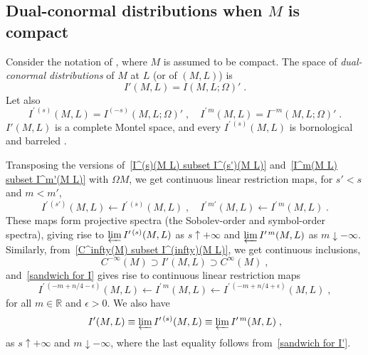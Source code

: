 \documentclass{memo-l}
\theoremstyle{plain}
\theoremstyle{definition}
\theoremstyle{remark}
\newcommand{\R}{\mathbb{R}}
\numberwithin{section}{chapter}
\numberwithin{equation}{section}%
\begin{document}
\subsection{Dual-conormal distributions when $M$ is compact}\label{ss: dual-conormal distribs - compact} 

Consider the notation of , where $M$ is assumed to be compact. The space of \emph{dual-conormal distributions}  of $M$ at $L$ (or of $(M,L)$) is \cite[Chapter~6]{Melrose1996} 
\begin{equation}\label{I'(M L) = I(M L Omega)'}
I'(M,L)=I(M,L;\Omega)'\;.
\end{equation}
Let also
\begin{equation}\label{I^prime (s)(M L) = I^(-s)(M L Omega)'}
I^{\prime\,(s)}(M,L)=I^{(-s)}(M,L;\Omega)'\;,\quad I^{\prime\,m}(M,L)=I^{-m}(M,L;\Omega)'\;.
\end{equation}
$I'(M,L)$ is a complete Montel space, and every $I^{\prime\,(s)}(M,L)$ is bornological and barreled \cite[Corollaries~5.1 and~5.2]{AlvKordyLeichtnam-conormal}. 

Transposing the versions of~\eqref{I^(s)(M L) subset I^(s')(M L)} and~\eqref{I^m(M L) subset I^m'(M L)} with $\Omega M$, we get continuous linear restriction maps, for $s'<s$ and $m<m'$,
\begin{equation}\label{I^prime m(M L) to I^prime m'(M L)}
I^{\prime\,(s')}(M,L)\leftarrow I^{\prime\,(s)}(M,L)\;,\quad I^{\prime\,m'}(M,L)\leftarrow I^{\prime\,m}(M,L)\;.
\end{equation}
These maps form projective spectra (the Sobolev-order and symbol-order spectra), giving rise to $\varprojlim I^{\prime\,(s)}(M,L)$ as $s\uparrow+\infty$ and $\varprojlim I^{\prime\,m}(M,L)$ as $m\downarrow-\infty$. Similarly, from~\eqref{C^infty(M) subset I^(infty)(M L)}, we get continuous inclusions,
\begin{equation}\label{C^-infty(M) supset I'(M L) supset C^infty(M)}
C^{-\infty}(M)\supset I'(M,L)\supset C^\infty(M)\;,
\end{equation}
and~\eqref{sandwich for I} gives rise to continuous linear restriction maps
\begin{equation}\label{sandwich for I'}
I^{\prime\,(-m+n/4-\epsilon)}(M,L)\leftarrow I^{\prime\,m}(M,L)\leftarrow I^{\prime\,(-m+n/4+\epsilon)}(M,L)\;,
\end{equation}
for all $m\in\R$ and $\epsilon>0$. We also have \cite[Corollary 5.3]{AlvKordyLeichtnam-conormal}
\begin{equation}\label{I'(M L) equiv projlim I^prime (s)(M L) equiv projlim I^prime m(M L)}
I'(M,L)\equiv\varprojlim I^{\prime\,(s)}(M,L)\equiv\varprojlim I^{\prime\,m}(M,L)\;,
\end{equation}
as $s\uparrow+\infty$ and $m\downarrow-\infty$, where the last equality follows from~\eqref{sandwich for I'}.
\end{document}
